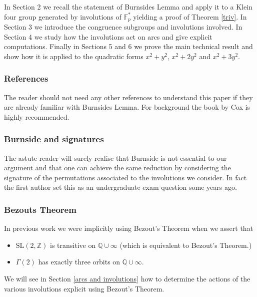 \documentclass[12pt,a4paper]{amsart}
\def\ZZ{\mathbb{Z}}
\def\QQ{\mathbb{Q}}
\def\fp{\mathbb{F}_p}
\def\sl2{\mathrm{SL}(2, \ZZ)}
\begin{document}
In Section 2 we recall the statement of Burnsides Lemma 
and apply it to a Klein four group generated by involutions of $\fp^*$
yielding a proof of Theorem \ref{triv}. 
In Section 3  we  introduce the  congruence subgroups and involutions involved.
In Section 4 we study how the involutions act on arcs and give explicit computations.  
Finally in Sections 5  and 6  we prove the main technical result and show how it is applied
to the quadratic forms $x^2 + y^2$, $x^2 + 2y^2$ and $x^2 + 3y^2$.


\subsubsection{References}
The reader should not need any other references to understand 
this paper if they are already familiar with  Burnsides Lemma.
For background the book by Cox \cite{cox} is highly recommended.

\subsubsection{Burnside and signatures}
 The astute reader will surely realise that Burnside is not essential to our argument
 and that one can achieve the same reduction by considering the signature
 of the permutations associated to the  involutions we consider. 
 In fact the first author set this as an  undergraduate exam question some years ago.
 
 
 
 \subsubsection{Bezouts Theorem}
 In previous work \cite{vlad} we were implicitly using  Bezout's Theorem
 when we assert that
 \begin{itemize}
 \item $\sl2$ is transitive on $\QQ \cup \infty$ (which is equivalent to Bezout's Theorem.)
 \item $\Gamma(2) $ has exactly three orbits on $\QQ \cup \infty$.
 \end{itemize}
 We  will see in Section \ref{arcs and involutions} how to determine  the actions 
 of the various involutions explicit using Bezout's Theorem.
 
\end{document}
